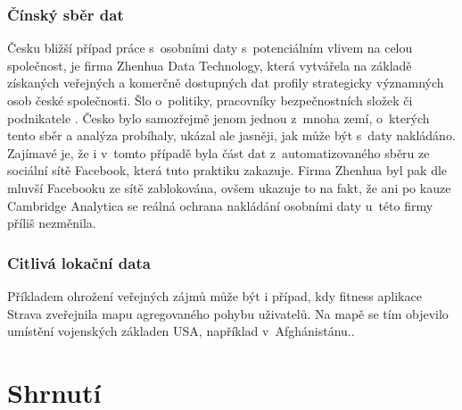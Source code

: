 \subsubsection{Čínský sběr dat}
Česku bližší případ práce s~osobními daty s~potenciálním vlivem na celou společnost, je firma Zhenhua Data Technology, která vytvářela na základě získaných veřejných a komerčně dostupných dat profily strategicky významných osob české společnosti. Šlo o~politiky, pracovníky bezpečnostních složek či podnikatele \citep{china-czech}. Česko bylo samozřejmě jenom jednou z~mnoha zemí, o~kterých tento sběr a analýza probíhaly, ukázal ale jasněji, jak může být s~daty nakládáno.
Zajímavé je, že i v~tomto případě byla část dat z~automatizovaného sběru ze sociální sítě Facebook, která tuto praktiku zakazuje. Firma Zhenhua byl pak dle mluvší Facebooku ze sítě zablokována, ovšem ukazuje to na fakt, že ani po kauze Cambridge Analytica se reálná ochrana nakládání osobními daty u~této firmy příliš nezměnila.

\subsubsection{Citlivá lokační data}
Příkladem ohrožení veřejných zájmů může být i případ, kdy fitness aplikace Strava zveřejnila mapu agregovaného pohybu uživatelů. Na mapě se tím objevilo umístění vojenských základen USA, například v~Afghánistánu.\citep{strava-locations}. 

\section{Shrnutí}
